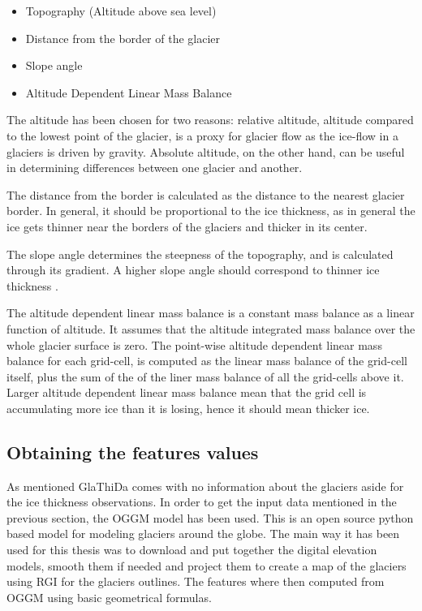 \begin{itemize}
	\item Topography (Altitude above sea level)
	\item Distance from the border of the glacier
	\item Slope angle
	\item Altitude Dependent Linear Mass Balance 
\end{itemize}
The altitude has been chosen for two reasons: relative altitude, altitude compared to the lowest point of the glacier, is a proxy for glacier flow as the ice-flow in a glaciers is driven by gravity. Absolute altitude, on the other hand, can be useful in determining differences between one glacier and another.

The distance from the border is calculated as the distance to the nearest glacier border. In general, it should be proportional to the ice thickness, as in general the ice gets thinner near the borders of the glaciers and thicker in its center. 

The slope angle determines the steepness of the topography, and is calculated through its gradient. A higher slope angle should correspond to thinner ice thickness \cite[P. 298]{cuffey2010physics}.

The altitude dependent linear mass balance  is a constant mass balance as a linear function of altitude. It assumes that the altitude integrated mass balance over the whole glacier surface is zero. The point-wise altitude dependent linear mass balance for each grid-cell, is computed as the linear mass balance of the grid-cell itself, plus the sum of the of the liner mass balance of all the grid-cells above it. Larger altitude dependent linear mass balance mean that the grid cell is accumulating more ice than it is losing, hence it should mean thicker ice. 
  
\subsection{Obtaining the features values}
As mentioned GlaThiDa comes with no information about the glaciers aside for the ice thickness observations. In order to get the input data mentioned in the previous section, the OGGM model has been used. This is an open source python based model for modeling glaciers around the globe. The main way it has been used for this thesis was to download and put together the digital elevation models, smooth them if needed and project them to create a map of the glaciers using RGI for the glaciers outlines. The features where then computed from OGGM using basic geometrical formulas. 

